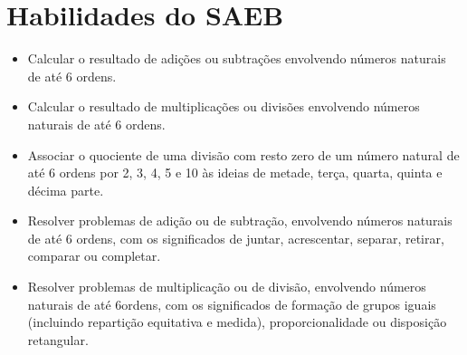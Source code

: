 \section{Habilidades do SAEB}

\begin{itemize}
\item Calcular o resultado de adições ou subtrações envolvendo números
naturais de até 6 ordens.

\item Calcular o resultado de multiplicações ou divisões envolvendo números
naturais de até 6 ordens.

\item Associar o quociente de uma divisão com resto zero de um número
natural de até 6 ordens por 2, 3, 4, 5 e 10 às ideias de metade, terça,
quarta, quinta e décima parte.

\item Resolver problemas de adição ou de subtração, envolvendo números
naturais de até 6 ordens, com os significados de juntar, acrescentar,
separar, retirar, comparar ou completar.

\item Resolver problemas de multiplicação ou de divisão, envolvendo números
naturais de até 6ordens, com os significados de formação de grupos
iguais (incluindo repartição equitativa e medida), proporcionalidade ou
disposição retangular.
\end{itemize}

